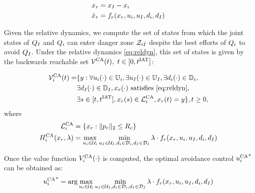 \begin{equation}
\label{eq:reldyn}
\begin{aligned}
\state_r &= \state_\intr - \state_i \\
\dot \state_r &= f_r(\state_r, \ctrl_i, \ctrl_\intr, \dstb_i, \dstb_\intr)
\end{aligned}
\end{equation}

Given the relative dynamics, we compute the set of states from which the joint states of $Q_{I}$ and $Q_i$ can enter danger zone $\mathcal{Z}_{iI}$ despite the best efforts of $Q_i$ to avoid $Q_{I}$. Under the relative dynamics \eqref{eq:reldyn}, this set of states is given by the backwards reachable set $\mathcal{V}^{\text{CA}}(t),~ t \in [0, t^\text{IAT}]$:%

\begin{equation} \label{eqn:optAvoid}
\begin{aligned}
\brs^{\text{CA}}_{i}(t) = & \{y: \forall \ctrl_i(\cdot) \in \cfset_i, \exists \ctrl_\intr(\cdot) \in \cfset_\intr, \exists \dstb_i(\cdot) \in \dfset_i, \\
& \exists \dstb_\intr(\cdot) \in \dfset_\intr, \state_r(\cdot) \text{ satisfies \eqref{eq:reldyn}},\\
& \exists s \in [t, \iat], \state_r(s) \in \targetset^{\text{CA}}_{i}, \state_r(t) = y\}, t \geq 0, 
\end{aligned}
\end{equation}
where 
\begin{equation}
\begin{aligned}
\mathcal{L}^{\text{CA}}_{i} &= \{x_r: \|p_r\|_2 \le R_c\} \\
H^{\text{CA}}_{i}(x_r, \lambda) &= \max_{u_i \in \mathcal{U}_i} \min_{u_I \in \mathcal{U}_I, d_i \in \mathcal{D}_i, d_I \in \mathcal{D}_I} \lambda \cdot f_r(x_r, u_i, u_I, d_i, d_I)
\end{aligned}
\end{equation}

Once the value function $V^{\text{CA}}_{i}(\cdot)$ is computed, the optimal avoidance control ${u^{\text{CA}}_{i}}^*$ can be obtained as:
\begin{equation} \label{eqn:optAvoidCtrl}
{\ctrl^{\text{CA}}_{i}}^* = \arg \max_{\ctrl_i \in \cset_i} \min_{\ctrl_\intr \in \cset_\intr, \dstb_i \in \dset_i, \dstb_\intr \in \dset_\intr} \costate \cdot f_r(\state_r, \ctrl_i, \ctrl_\intr, \dstb_i, \dstb_\intr)
\end{equation}

